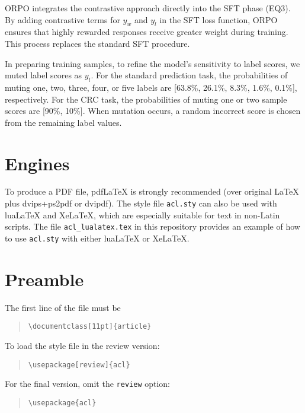 \documentclass[11pt]{article}
\begin{document}

ORPO integrates the contrastive approach directly into the SFT phase (EQ3). By adding contrastive terms for $y_w$ and $y_l$ in the SFT loss function, ORPO ensures that highly rewarded responses receive greater weight during training. This process replaces the standard SFT procedure.


In preparing training samples, to refine the model’s sensitivity to label scores, we muted label scores as $y_l$. For the standard prediction task, the probabilities of muting one, two, three, four, or five labels are [63.8\%, 26.1\%, 8.3\%, 1.6\%, 0.1\%], respectively. For the CRC task, the probabilities of muting one or two sample scores are [90\%, 10\%]. When mutation occurs, a random incorrect score is chosen from the remaining label values.



\section{Engines}

To produce a PDF file, pdf\LaTeX{} is strongly recommended (over original \LaTeX{} plus dvips+ps2pdf or dvipdf).
The style file \texttt{acl.sty} can also be used with
lua\LaTeX{} and
Xe\LaTeX{}, which are especially suitable for text in non-Latin scripts.
The file \texttt{acl\_lualatex.tex} in this repository provides
an example of how to use \texttt{acl.sty} with either
lua\LaTeX{} or
Xe\LaTeX{}.

\section{Preamble}

The first line of the file must be
\begin{quote}
\begin{verbatim}
\documentclass[11pt]{article}
\end{verbatim}
\end{quote}

To load the style file in the review version:
\begin{quote}
\begin{verbatim}
\usepackage[review]{acl}
\end{verbatim}
\end{quote}
For the final version, omit the \verb|review| option:
\begin{quote}
\begin{verbatim}
\usepackage{acl}
\end{verbatim}
\end{quote}
\end{document}
